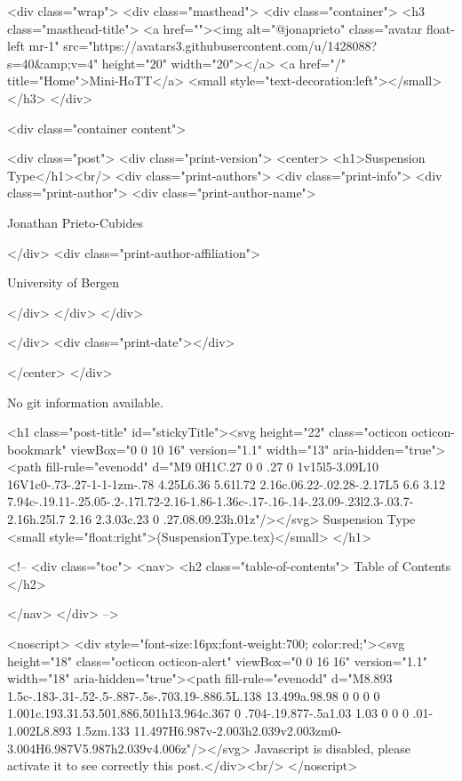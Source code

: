     <div class="wrap">
      <div class="masthead">
        <div class="container">
          <h3 class="masthead-title">
            <a href=""><img alt="@jonaprieto" class="avatar float-left mr-1" src="https://avatars3.githubusercontent.com/u/1428088?s=40&amp;v=4" height="20" width="20"></a>
            <a href="/" title="Home">Mini-HoTT</a>
            <small style="text-decoration:left"></small>
          </h3>
        </div>
      
      <div class="container content">
        







<div class="post">
  <div class="print-version">
    <center>
      <h1>Suspension Type</h1><br/>
        <div class="print-authors">
          <div class="print-info">
            <div class="print-author">
              <div class="print-author-name">
                
                  Jonathan Prieto-Cubides
                
              </div>
              <div class="print-author-affiliation">
                
                  University of Bergen
                
                </div>
            </div>
          </div>
          
          
        </div>
        <div class="print-date"></div>
        
        
    </center>
  </div>

  
  No git information available.
  

  <h1 class="post-title" id="stickyTitle"><svg height="22" class="octicon octicon-bookmark" viewBox="0 0 10 16" version="1.1" width="13" aria-hidden="true"><path fill-rule="evenodd" d="M9 0H1C.27 0 0 .27 0 1v15l5-3.09L10 16V1c0-.73-.27-1-1-1zm-.78 4.25L6.36 5.61l.72 2.16c.06.22-.02.28-.2.17L5 6.6 3.12 7.94c-.19.11-.25.05-.2-.17l.72-2.16-1.86-1.36c-.17-.16-.14-.23.09-.23l2.3-.03.7-2.16h.25l.7 2.16 2.3.03c.23 0 .27.08.09.23h.01z"/></svg> Suspension Type <small style="float:right">(SuspensionType.tex)</small>
  </h1>

  <!-- 
  <div class="toc">
    <nav>
    <h2 class="table-of-contents"> Table of Contents </h2>
      

    </nav>
  </div>
   -->

  <noscript>
  <div style="font-size:16px;font-weight:700; color:red;"><svg height="18" class="octicon octicon-alert" viewBox="0 0 16 16" version="1.1" width="18" aria-hidden="true"><path fill-rule="evenodd" d="M8.893 1.5c-.183-.31-.52-.5-.887-.5s-.703.19-.886.5L.138 13.499a.98.98 0 0 0 0 1.001c.193.31.53.501.886.501h13.964c.367 0 .704-.19.877-.5a1.03 1.03 0 0 0 .01-1.002L8.893 1.5zm.133 11.497H6.987v-2.003h2.039v2.003zm0-3.004H6.987V5.987h2.039v4.006z"/></svg> Javascript is disabled, please activate it to see correctly this post.</div><br/>
  </noscript>

